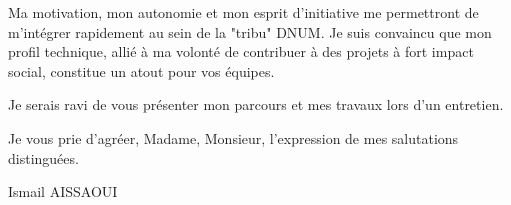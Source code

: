 \documentclass[11pt,a4paper]{article}
\begin{document}
Ma motivation, mon autonomie et mon esprit d'initiative me permettront de m'intégrer rapidement au sein de la "tribu" DNUM. Je suis convaincu que mon profil technique, allié à ma volonté de contribuer à des projets à fort impact social, constitue un atout pour vos équipes.

Je serais ravi de vous présenter mon parcours et mes travaux lors d'un entretien.

Je vous prie d'agréer, Madame, Monsieur, l'expression de mes salutations distinguées.

\bigskip

\noindent Ismail AISSAOUI
\end{document}
